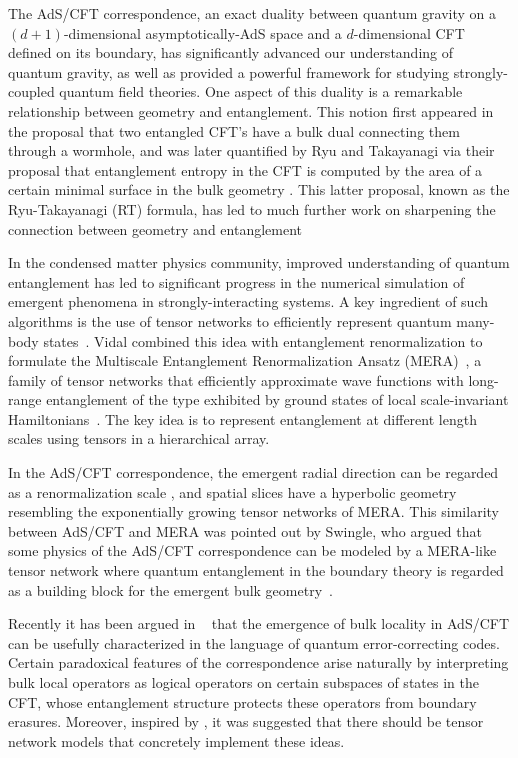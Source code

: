 \documentclass[12pt]{article}
\theoremstyle{plain}
\theoremstyle{plain}
\theoremstyle{plain}
\theoremstyle{plain}
\theoremstyle{result}
\theoremstyle{remark}
\theoremstyle{conjecture}
\theoremstyle{observation}
\theoremstyle{definition}
\theoremstyle{corollary}
\theoremstyle{definition}
\theoremstyle{definition}
\theoremstyle{assumption}
\theoremstyle{definition}
\theoremstyle{problem}
\theoremstyle{fact}
\begin{document}
The AdS/CFT correspondence, an exact duality between quantum gravity on a $(d{+}1)$-dimensional asymptotically-AdS space and a $d$-dimensional CFT defined on its boundary,
has significantly advanced our understanding of quantum gravity, as well as provided a powerful framework for studying strongly-coupled quantum field theories.  One aspect of this duality is a remarkable relationship between geometry and entanglement.  This notion first appeared in the proposal \cite{Maldacena03} that two entangled CFT's have a bulk dual connecting them through a wormhole, and was later quantified by Ryu and Takayanagi via their proposal that entanglement entropy in the CFT is computed by the area of a certain minimal surface in the bulk geometry \cite{Ryu06, Ryu06b}. This latter proposal, known as the Ryu-Takayanagi (RT) formula, has led to much further work on sharpening the connection between geometry and entanglement \cite{Hubeny07, Headrick07,Raamsdonk09, Raamsdonk10, Hayden13b, Lewkowycz13,Maldacena13, Lashkari14}

In the condensed matter physics community, improved understanding of quantum entanglement has led to significant progress in the numerical simulation of emergent phenomena in strongly-interacting systems. 
A key ingredient of such algorithms is the use of tensor networks to efficiently represent quantum many-body states~\cite{Vidal03b, Verstraete04b, Verstraete08}. 
Vidal combined this idea with entanglement renormalization to formulate the Multiscale Entanglement Renormalization Ansatz (MERA)~\cite{Vidal07, Vidal08}, a family of tensor networks that efficiently approximate wave functions with long-range entanglement of the type exhibited by ground states of local scale-invariant Hamiltonians~\cite{Evenbly09, Evenbly09b, Evenbly10}. 
The key idea is to represent entanglement at different length scales using tensors in a hierarchical array.

In the AdS/CFT correspondence, the emergent radial direction can be regarded as a renormalization scale \cite{Susskind1998}, and spatial slices have a hyperbolic geometry resembling the exponentially growing tensor networks of MERA.  This similarity between AdS/CFT and MERA was pointed out by Swingle, who argued that some physics of the AdS/CFT correspondence can be modeled by a MERA-like tensor network where quantum entanglement in the boundary theory is regarded as a building block for the emergent bulk geometry~\cite{Swingle12, Swingle12b}.

Recently it has been argued in ~\cite{Almheiri14} that the emergence of bulk locality in AdS/CFT can be usefully characterized in the language of quantum error-correcting codes.  
Certain paradoxical features of the correspondence arise naturally by interpreting bulk local operators as logical operators on certain subspaces of states in the CFT, whose entanglement structure protects these operators from boundary erasures.  Moreover, inspired by \cite{Swingle12, Swingle12b}, it was suggested that there should be tensor network models that concretely implement these ideas.  
\end{document}
